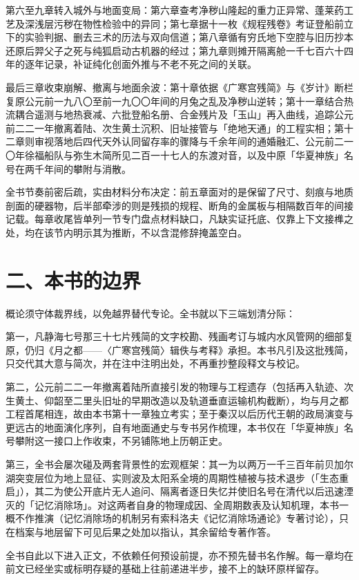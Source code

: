 第六至九章转入城外与地面变局：第六章查考净秽山隆起的重力正异常、蓬莱药工艺及深浅层污秽在物性检验中的异同；第七章据十一枚《规程残卷》考证登船前立下的实验判据、删去三术的历法与双向信道；第八章循有穷氏地下空腔与旧历抄本还原后羿父子之死与纯狐启动古机器的经过；第九章则摊开隔离舱一千七百六十四年的逐年记录，补证纯化创面外推与不老不死之间的关联。

最后三章收束崩解、撤离与地面余波：第十章依据《广寒宫残简》与《岁计》断栏复原公元前一九八〇至前一九〇〇年间的月兔之乱及净秽山逆转；第十一章结合热流耦合遥测与地热衰减、六批登船名册、合金残片及「玉山」再入曲线，追踪公元前二二一年撤离着陆、次生黄土沉积、旧址接管与「绝地天通」的工程实相；第十二章则审视落地后四代天外认同留存率的骤降与千余年间的通婚融汇、公元前二一〇年徐福船队与弥生木简所见二百一十七人的东渡对音，以及中原「华夏神族」名号在两千年间的攀附与消散。

全书节奏前密后疏，实由材料分布决定：前五章面对的是保留了尺寸、刻痕与地质剖面的硬器物，后半部牵涉的则是残损的规程、断角的金属板与相隔数百年的间接记载。每章收尾皆单列一节专门盘点材料缺口，凡缺实证托底、仅靠上下文接榫之处，均在该节内明示其为推断，不以含混修辞掩盖空白。

\section*{二、本书的边界}

概论须守体裁界线，以免越界替代专论。全书就以下三端划清分际：

第一，凡静海七号那三十七片残简的文字校勘、残画考订与城内水风管网的细部复原，仍归《月之都——〈广寒宫残简〉辑佚与考释》承担。本书凡引及这批残简，只交代其大意与简次，并在注中注明出处，不再重抄整段释文与校记。

第二，公元前二二一年撤离着陆所直接引发的物理与工程遗存（包括再入轨迹、次生黄土、仰韶至二里头旧址的早期改造以及轨道垂直运输机构截断），均与月之都工程首尾相连，故由本书第十一章独立考实；至于秦汉以后历代王朝的政局演变与更远古的地面演化序列，自有地面通史与专书另作梳理，本书仅在「华夏神族」名号攀附这一接口上作收束，不另铺陈地上历朝正史。

第三，全书会屡次碰及两套背景性的宏观框架：其一为以两万一千三百年前贝加尔湖突变层位为地上显征、实则波及太阳系全境的周期性植被与技术退步（「生态重启」），其二为使公开底片无人追问、隔离者逐日失忆并使旧名号在清代以后迅速湮灭的「记忆消除场」。对这两者自身的物理成因、全周期数表及认知机理，本书一概不作推演（记忆消除场的机制另有索科洛夫《记忆消除场通论》专著讨论），只在档案与地层留下可见后果之处加以指认，其余留给专著作答。

全书自此以下进入正文，不依赖任何预设前提，亦不预先替书名作解。每一章均在前文已经坐实或标明存疑的基础上往前递进半步，接不上的缺环原样留存。
